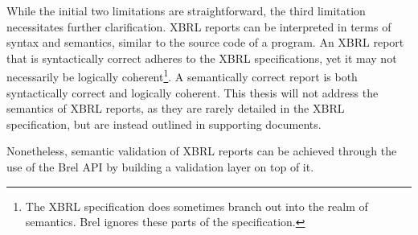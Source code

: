 While the initial two limitations are straightforward, the third limitation necessitates further clarification.
XBRL reports can be interpreted in terms of syntax and semantics, similar to the source code of a program.
An XBRL report that is syntactically correct adheres to the XBRL specifications, yet it may not necessarily be logically coherent\footnote{The XBRL specification does sometimes branch out into the realm of semantics. Brel ignores these parts of the specification.}.
A semantically correct report is both syntactically correct and logically coherent.
This thesis will not address the semantics of XBRL reports, 
as they are rarely detailed in the XBRL specification,
but are instead outlined in supporting documents.

Nonetheless, semantic validation of XBRL reports can be achieved through the use of the Brel API by building a validation layer on top of it.

